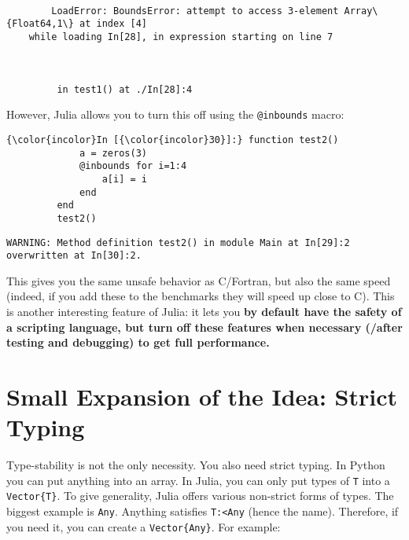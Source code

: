 \documentclass[11pt]{article}
\begin{document}
    \begin{Verbatim}[commandchars=\\\{\}]

        LoadError: BoundsError: attempt to access 3-element Array\{Float64,1\} at index [4]
    while loading In[28], in expression starting on line 7

        

         in test1() at ./In[28]:4

    \end{Verbatim}

    However, Julia allows you to turn this off using the \texttt{@inbounds}
macro:

    \begin{Verbatim}[commandchars=\\\{\}]
{\color{incolor}In [{\color{incolor}30}]:} function test2()
             a = zeros(3)
             @inbounds for i=1:4
                 a[i] = i
             end
         end
         test2()
\end{Verbatim}

    \begin{Verbatim}[commandchars=\\\{\}]
WARNING: Method definition test2() in module Main at In[29]:2 overwritten at In[30]:2.

    \end{Verbatim}

    This gives you the same unsafe behavior as C/Fortran, but also the same
speed (indeed, if you add these to the benchmarks they will speed up
close to C). This is another interesting feature of Julia: it lets you
\textbf{by default have the safety of a scripting language, but turn off
these features when necessary (/after testing and debugging) to get full
performance.}

    \section{Small Expansion of the Idea: Strict
Typing}\label{small-expansion-of-the-idea-strict-typing}

    Type-stability is not the only necessity. You also need strict typing.
In Python you can put anything into an array. In Julia, you can only put
types of \texttt{T} into a \texttt{Vector\{T\}}. To give generality,
Julia offers various non-strict forms of types. The biggest example is
\texttt{Any}. Anything satisfies \texttt{T:\textless{}Any} (hence the
name). Therefore, if you need it, you can create a
\texttt{Vector\{Any\}}. For example:
\end{document}

